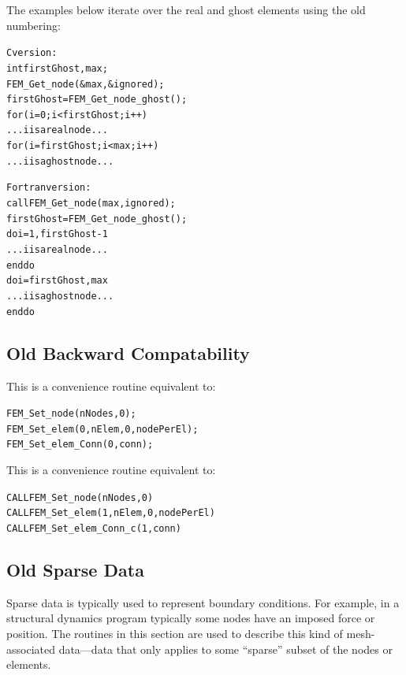 
The examples below iterate over the real and ghost elements using the old numbering:
\begin{alltt}
C version:
        int firstGhost,max;
        FEM\_Get\_node(\&max, \&ignored);
        firstGhost=FEM\_Get\_node\_ghost();
        for (i=0;i<firstGhost;i++)
                ... i is a real node...
        for (i=firstGhost;i<max;i++)
                ... i is a ghost node ...

Fortran version:
        call FEM\_Get\_node(max,ignored);
        firstGhost=FEM\_Get\_node\_ghost();
        do i=1,firstGhost-1
                ... i is a real node...
        end do
        do i=firstGhost,max
                ... i is a ghost node...
        end do
\end{alltt}



\subsection{Old Backward Compatability}

     This is a convenience routine equivalent to:
\begin{alltt}
          FEM\_Set\_node(nNodes,0);
          FEM\_Set\_elem(0,nElem,0,nodePerEl);
          FEM\_Set\_elem\_Conn(0,conn);
\end{alltt}


     This is a convenience routine equivalent to:
\begin{alltt}
          CALL FEM\_Set\_node(nNodes,0)
          CALL FEM\_Set\_elem(1,nElem,0,nodePerEl)
          CALL FEM\_Set\_elem\_Conn\_c(1,conn)
\end{alltt}


\subsection{Old Sparse Data}

Sparse data is typically used to represent boundary conditions.  For
example, in a structural dynamics program typically some nodes have 
an imposed force or position.  The routines in this section are 
used to describe this kind of mesh-associated data---data that only 
applies to some ``sparse'' subset of the nodes or elements.  


